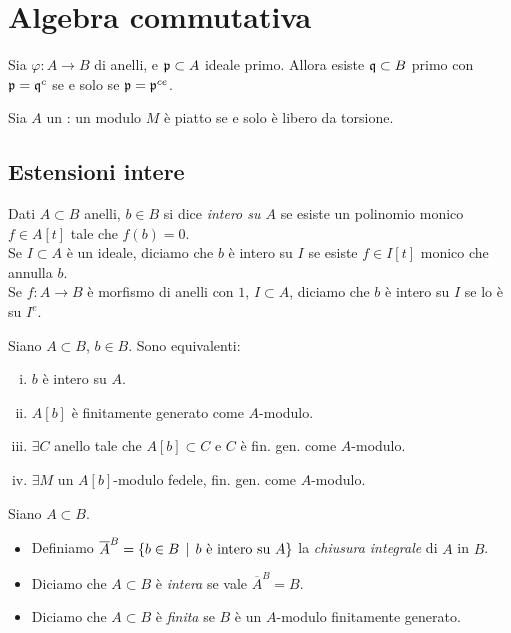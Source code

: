 \chapter{Algebra commutativa}

\begin{lemma}
    Sia $\varphi:A\to B$ di anelli, e $\mathfrak{p}\subset A$ ideale primo. Allora esiste $\mathfrak{q}\subset B$ primo con $\mathfrak{p}=\mathfrak{q}^c$ se e solo se $\mathfrak{p}=\mathfrak{p}^{ce}$.
\end{lemma}

\begin{lemma} 
	Sia $ A $ un \pid: un modulo $ M $ è piatto se e solo è libero da torsione.
\end{lemma}

\section{Estensioni intere}
\begin{definition}
 Dati $A\subset B$ anelli, $b\in B$ si dice \emph{intero su $A$} se esiste un polinomio monico $f\in A[t]$ tale che $f(b)=0$.\\
 Se $I\subset A$ è un ideale, diciamo che $b$ è intero su $I$ se esiste $f\in I[t]$ monico che annulla $b$.\\
 Se $f:A\to B$ è morfismo di anelli con $1$, $I\subset A$, diciamo che $b$ è intero su $I$ se lo è su $I^e$.
\end{definition}

\begin{proposition}
    Siano $A\subset B$, $b\in B$. Sono equivalenti:
    \begin{enumerate}[i.]
        \item $b$ è intero su $A$.
        \item $A[b]$ è finitamente generato come $A$-modulo.
        \item $\exists C$ anello tale che $A[b]\subset C $ e $C$ è fin. gen. come $A$-modulo.
        \item $\exists M$ un $A[b]$-modulo fedele, fin. gen. come $A$-modulo.
    \end{enumerate}
\end{proposition}

\begin{definition}
    Siano $A\subset B$.
    \begin{itemize}
        \item Definiamo $\overline{A}^B=\{ b\in B \operatorname{\; |\;} b \text{ è intero su } A \}$ la \emph{chiusura integrale} di $A$ in $B$.
        \item Diciamo che $A\subset B$ è \emph{intera} se vale $\overline{A}^B = B$.
        \item Diciamo che $A\subset B$ è \emph{finita} se $B$ è un $A$-modulo finitamente generato.
    \end{itemize}
\end{definition}

